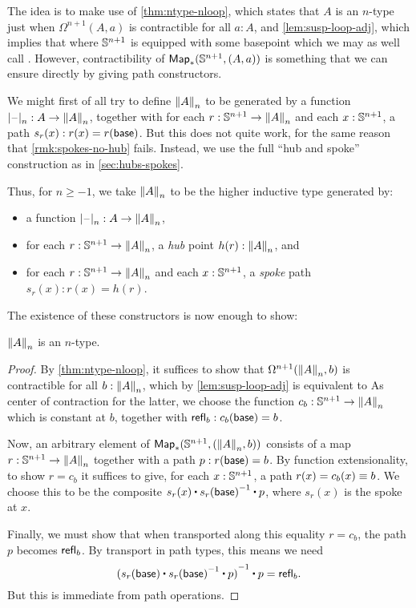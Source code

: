 The idea is to make use of \autoref{thm:ntype-nloop}, which states that $A$ is an $n$-type just when $\Omega^{n+1}(A,a)$
%
is contractible for
all $a:A$, and \autoref{lem:susp-loop-adj}, which implies that
 where $\Sn^{n+1}$ is equipp\-ed with some basepoint which we may as well call \base.
However, contractibility of $\Map_*(\Sn^{n+1},(A,a))$ is something that we can ensure directly by giving path constructors.

We might first of all try to define $\trunc nA$ to be generated by a function $\tprojf n : A \to \trunc n A$, together with for each
$r:\Sn^{n+1} \to \trunc n A$ and each $x:\Sn^{n+1}$, a path $s_r(x):r(x) = r(\base)$.
%
But this does not quite work, for the same reason that \autoref{rmk:spokes-no-hub} fails.
%
Instead, we use the full ``hub and spoke'' construction as in \autoref{sec:hubs-spokes}.

Thus, for $n\ge -1$, we take $\trunc nA$ to be the higher inductive type generated by:
\begin{itemize}
\item a function $\tprojf n : A \to \trunc n A$,
\item for each $r:\Sn^{n+1} \to \trunc n A$, a \emph{hub} point $h(r):\trunc n A$, and
\item for each $r:\Sn^{n+1} \to \trunc n A$ and each $x:\Sn^{n+1}$, a \emph{spoke} path $s_r(x):r(x) = h(r)$.
\end{itemize}

\noindent
The existence of these constructors is now enough to show:

\begin{lem}
  $\trunc n A$ is an $n$-type.
\end{lem}
\begin{proof}
  By \autoref{thm:ntype-nloop}, it suffices to show that $\Omega ^{n+1}(\trunc nA,b)$ is contractible for all $b:\trunc nA$, which by
\autoref{lem:susp-loop-adj} is equivalent to 
  As center of contraction for the latter, we choose the function $c_b:\Sn^{n+1} \to \trunc nA$ which is constant at $b$, together with
$\refl b : c_b(\base) = b$.

  Now, an arbitrary element of $\Map_*(\Sn^{n+1},(\trunc nA,b))$ consists of a map $r:\Sn^{n+1} \to \trunc n A$ together with a path
$p:r(\base)=b$.
  By function extensionality, to show $r = c_b$ it suffices to give, for each $x:\Sn^{n+1}$, a path $r(x)=c_b(x) \jdeq b$.
  We choose this to be the composite $s_r(x) \ct \opp{s_r(\base)} \ct p$, where $s_r(x)$ is the spoke at $x$.


  Finally, we must show that when transported along this equality $r=c_b$, the path $p$ becomes $\refl b$.
  By transport in path types, this means we need
  \[\opp{(s_r(\base) \ct \opp{s_r(\base)} \ct p)} \ct p = \refl b.\]
  But this is immediate from path operations.
\end{proof}

